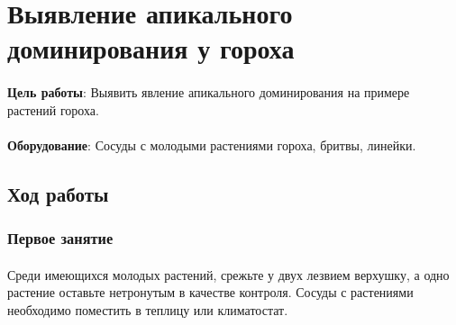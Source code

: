 \section*{\lbtitle Выявление апикального доминирования у гороха}




\paragraph*{}\textbf{Цель работы}: Выявить явление апикального доминирования на примере растений гороха.
\paragraph*{}\textbf{Оборудование}: Сосуды с молодыми растениями гороха, бритвы, линейки.

\subsection*{Ход работы}

	\subsubsection*{Первое занятие}
	
	\paragraph*{}Среди имеющихся молодых растений, срежьте у двух  лезвием верхушку, а одно растение оставьте нетронутым в качестве контроля. Сосуды с растениями необходимо поместить в теплицу или климатостат.
	
